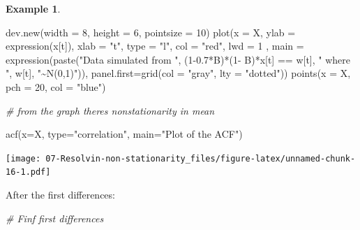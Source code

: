 \documentclass[
]{book}
\newenvironment{Shaded}{\begin{snugshade}}{\end{snugshade}}
\newcommand{\AttributeTok}[1]{\textcolor[rgb]{0.77,0.63,0.00}{#1}}
\newcommand{\CommentTok}[1]{\textcolor[rgb]{0.56,0.35,0.01}{\textit{#1}}}
\newcommand{\DecValTok}[1]{\textcolor[rgb]{0.00,0.00,0.81}{#1}}
\newcommand{\FloatTok}[1]{\textcolor[rgb]{0.00,0.00,0.81}{#1}}
\newcommand{\FunctionTok}[1]{\textcolor[rgb]{0.00,0.00,0.00}{#1}}
\newcommand{\NormalTok}[1]{#1}
\newcommand{\SpecialCharTok}[1]{\textcolor[rgb]{0.00,0.00,0.00}{#1}}
\newcommand{\StringTok}[1]{\textcolor[rgb]{0.31,0.60,0.02}{#1}}
\theoremstyle{definition}
\theoremstyle{definition}
\newtheorem{example}{Example}[chapter]
\theoremstyle{definition}
\theoremstyle{definition}
\theoremstyle{remark}
\begin{document}
\begin{example}
\begin{Shaded}
\begin{Highlighting}[]
\FunctionTok{dev.new}\NormalTok{(}\AttributeTok{width =} \DecValTok{8}\NormalTok{, }\AttributeTok{height =} \DecValTok{6}\NormalTok{, }\AttributeTok{pointsize =} \DecValTok{10}\NormalTok{)      }
\FunctionTok{plot}\NormalTok{(}\AttributeTok{x =}\NormalTok{ X, }\AttributeTok{ylab =} \FunctionTok{expression}\NormalTok{(x[t]), }\AttributeTok{xlab =} \StringTok{"t"}\NormalTok{, }\AttributeTok{type =} 
    \StringTok{"l"}\NormalTok{, }\AttributeTok{col =} \StringTok{"red"}\NormalTok{, }\AttributeTok{lwd =} \DecValTok{1}\NormalTok{ , }\AttributeTok{main =} 
    \FunctionTok{expression}\NormalTok{(}\FunctionTok{paste}\NormalTok{(}\StringTok{"Data simulated from "}\NormalTok{, (}\DecValTok{1}\FloatTok{{-}0.7}\SpecialCharTok{*}\NormalTok{B)}\SpecialCharTok{*}\NormalTok{(}\DecValTok{1}\SpecialCharTok{{-}}
\NormalTok{    B)}\SpecialCharTok{*}\NormalTok{x[t] }\SpecialCharTok{==}\NormalTok{ w[t], }\StringTok{" where "}\NormalTok{, w[t], }\StringTok{"\textasciitilde{}N(0,1)"}\NormalTok{)), }
    \AttributeTok{panel.first=}\FunctionTok{grid}\NormalTok{(}\AttributeTok{col =} \StringTok{"gray"}\NormalTok{, }\AttributeTok{lty =} \StringTok{"dotted"}\NormalTok{))}
\FunctionTok{points}\NormalTok{(}\AttributeTok{x =}\NormalTok{ X, }\AttributeTok{pch =} \DecValTok{20}\NormalTok{, }\AttributeTok{col =} \StringTok{"blue"}\NormalTok{)}

\CommentTok{\# from the graph there\textquotesingle{}s nonstationarity in mean}
\end{Highlighting}
\end{Shaded}

\begin{Shaded}
\begin{Highlighting}[]
\FunctionTok{acf}\NormalTok{(}\AttributeTok{x=}\NormalTok{X, }\AttributeTok{type=}\StringTok{"correlation"}\NormalTok{, }\AttributeTok{main=}\StringTok{"Plot of the ACF"}\NormalTok{)}
\end{Highlighting}
\end{Shaded}

\texttt{[image: 07-Resolvin-non-stationarity\_files/figure-latex/unnamed-chunk-16-1.pdf]}

After the first differences:

\begin{Shaded}
\begin{Highlighting}[]
\CommentTok{\# Finf first differences}


\end{Highlighting}
\end{Shaded}
\end{example}
\end{document}
